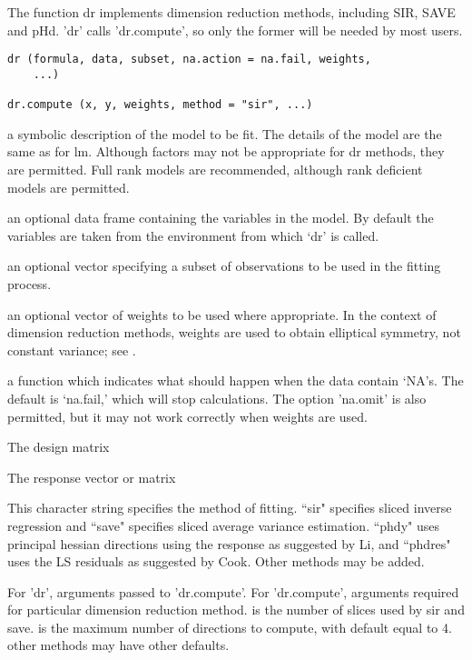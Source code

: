 \begin{Description}\relax
The function dr implements dimension reduction methods, including SIR, SAVE and pHd.
'dr' calls 'dr.compute', so only the former will be needed by most users.
\end{Description}
\begin{Usage}
\begin{verbatim}
dr (formula, data, subset, na.action = na.fail, weights, 
    ...)
    
dr.compute (x, y, weights, method = "sir", ...)
 \end{verbatim}
\end{Usage}
\begin{Arguments}
\begin{ldescription}
\item[\code{formula}] a symbolic description of the model to be fit. The details of
the model are the same as for lm. Although factors may not be 
appropriate for dr methods, they are permitted.  Full rank models are
recommended, although rank deficient models are permitted.
\item[\code{data}] an optional data frame containing the variables in the model.
By default the variables are taken from the environment from
which `dr' is called.
\item[\code{subset}] an optional vector specifying a subset of observations to be
used in the fitting process.
\item[\code{weights}] an optional vector of weights to be used where appropriate.  In the
context of dimension reduction methods, weights are used to obtain
elliptical symmetry, not constant variance; see .
\item[\code{na.action}] a function which indicates what should happen when the data
contain `NA's.  The default is `na.fail,' which will stop calculations.
The option 'na.omit' is also permitted, but it may not work correctly when
weights are used.
\item[\code{x}] The design matrix
\item[\code{y}] The response vector or matrix
\item[\code{method}] This character string specifies the method of fitting.  ``sir"
specifies sliced inverse regression and ``save" specifies sliced
average variance estimation.  ``phdy" uses principal hessian
directions using the response as suggested by Li, and ``phdres" 
uses the LS residuals as suggested by Cook. Other methods may be
added.
\item[\code{...}] For 'dr', arguments passed to 'dr.compute'.  For 'dr.compute', 
arguments required for particular dimension reduction method.
 is the number of slices used by sir and save.
 is the maximum number of directions to compute, with
default equal to 4. other methods may have other defaults.
\end{ldescription}
\end{Arguments}

